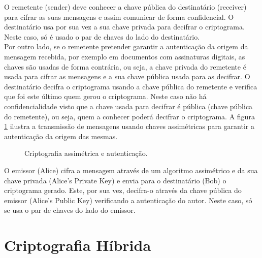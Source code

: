 \documentclass[a4paper,11pt,openright,oneside]{report}
\begin{document}
O remetente (sender) deve conhecer a chave pública do destinatário (receiver) para cifrar as suas mensagens e assim comunicar de forma confidencial. O destinatário usa por sua vez a sua chave privada para decifrar o criptograma. Neste caso, só é usado o par de chaves do lado do destinatário.\\

Por outro lado, se o remetente pretender garantir a autenticação da origem da mensagem recebida, por exemplo em documentos com assinaturas digitais, as chaves são usadas de forma contrária, ou seja, a chave privada do remetente é usada para cifrar as mensagens e a sua chave pública usada para as decifrar. O destinatário decifra o criptograma usando a chave pública do remetente e verifica que foi este último quem gerou o criptograma. Neste caso não há confidencialidade visto que a chave usada para decifrar é pública (chave pública do remetente), ou seja, quem a conhecer poderá decifrar o criptograma. A figura \ref{fig:crypto4} ilustra a transmissão de mensagens usando chaves assimétricas para garantir a autenticação da origem das mesmas.\\

\begin{figure}[ht]
\center
{}
\caption{Criptografia assimétrica e autenticação.}
\label{fig:crypto4}
\end{figure}

O emissor (Alice) cifra a mensagem através de um algoritmo assimétrico e da sua chave privada (Alice’s Private Key) e envia para o destinatário (Bob) o criptograma gerado. Este, por sua vez, decifra-o através da chave pública do emissor (Alice’s Public Key) verificando a autenticação do autor. Neste caso, só se usa o par de chaves do lado do emissor.

\section{Criptografia Híbrida}
\label{chap.híbrida}
\end{document}
